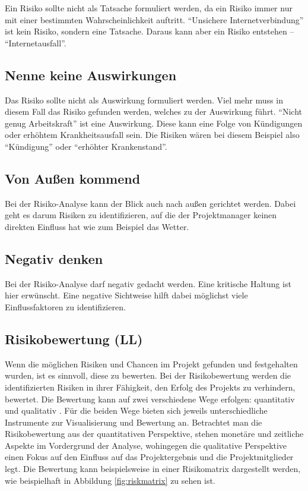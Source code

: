 \documentclass[ThesisDJ.tex]{subfiles}
\begin{document}
Ein Risiko sollte nicht als Tatsache formuliert werden, da ein Risiko immer nur mit einer bestimmten Wahrscheinlichkeit auftritt. “Unsichere Internetverbindung” ist kein Risiko, sondern eine Tatsache. Daraus kann aber ein Risiko entstehen – “Internetausfall”.

\subsection{Nenne keine Auswirkungen}

Das Risiko sollte nicht als Auswirkung formuliert werden. Viel mehr muss in diesem Fall das Risiko gefunden werden, welches zu der Auswirkung führt. “Nicht genug  Arbeitskraft” ist eine Auswirkung. Diese kann eine Folge von Kündigungen oder erhöhtem Krankheitsausfall sein. Die Risiken wären bei diesem Beispiel also “Kündigung” oder “erhöhter Krankenstand”.


\subsection{Von Außen kommend}

Bei der Risiko-Analyse kann der Blick auch nach außen gerichtet werden. Dabei geht es darum Risiken zu identifizieren, auf die der Projektmanager keinen direkten Einfluss hat wie zum Beispiel das Wetter. 

\subsection{Negativ denken}

Bei der Risiko-Analyse darf negativ gedacht werden. Eine kritische Haltung ist hier erwünscht. Eine negative Sichtweise hilft dabei möglichst viele Einflussfaktoren zu identifizieren.


\subsection{Risikobewertung (LL)}
Wenn die möglichen Risiken und Chancen im Projekt gefunden und festgehalten wurden, ist es sinnvoll, diese zu bewerten. Bei der Risikobewertung werden die identifizierten Risiken in ihrer Fähigkeit, den Erfolg des Projekts zu verhindern, bewertet. Die Bewertung kann auf zwei verschiedene Wege erfolgen: quantitativ und qualitativ \cite[S.~300 ff.]{patzak2017projektmanagement}. Für die beiden Wege bieten sich jeweils unterschiedliche Instrumente zur Visualisierung und Bewertung an. Betrachtet man die Risikobewertung aus der quantitativen Perspektive, stehen monetäre und zeitliche Aspekte im Vordergrund der Analyse, wohingegen die qualitative Perspektive einen Fokus auf den Einfluss auf das Projektergebnis und die Projektmitglieder legt. Die Bewertung kann beispielsweise in einer Risikomatrix dargestellt werden, wie beispielhaft in Abbildung \ref{fig:riskmatrix}\cite[S.~24]{cicek2022risikomanagement} zu sehen ist.
\end{document}

